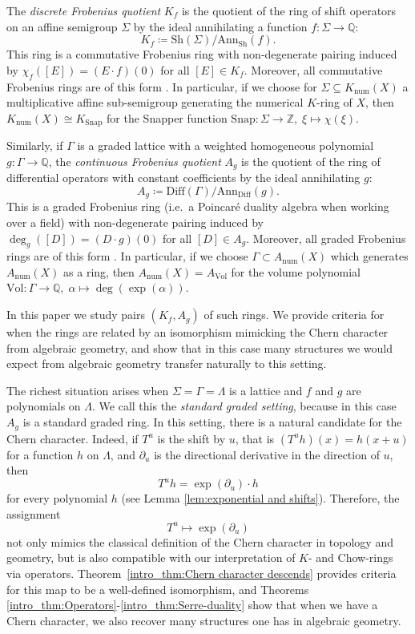 \documentclass[oneside]{amsart}
\theoremstyle{plain}
\theoremstyle{definition}
\newcommand{\Z}{{\mathbb{Z}}}
\newcommand{\Q}{{\mathbb{Q}}}
\newcommand{\Ann}{{\mathrm{Ann}}}
\newcommand{\Diff}{{\mathrm{Diff}}}
\newcommand{\Vol}{{\mathrm{Vol}}}
\newcommand{\Snap}{{\mathrm{Snap}}}
\newcommand{\Sh}{{\mathrm{Sh}}}
\newcommand{\num}{{\mathrm{num}}}
\begin{document}
The \emph{discrete Frobenius quotient} $K_f$ is the quotient of the ring of shift operators on an affine semigroup $\Sigma$ by the ideal annihilating a function $f\colon \Sigma\to \Q$:
\[K_f \coloneqq \Sh(\Sigma)/\Ann_{\Sh}(f).\]
This ring is a commutative Frobenius ring with non-degenerate pairing induced by
$\chi_f([E]) = (E \cdot f)(0)$ for all $[E] \in K_f$. Moreover, all commutative Frobenius rings are of this form \cite{MoninSmirnov23}. In particular, if we choose for $\Sigma\subseteq K_\num(X)$ a multiplicative affine sub-semigroup generating the numerical $K$-ring of $X$, then $K_\num(X) \cong K_\Snap$ for the Snapper function $\Snap: \Sigma \to \Z,\; \xi \mapsto \chi(\xi)$. 

Similarly, if $\Gamma$ is a graded lattice with a weighted homogeneous polynomial $g: \Gamma \to \Q$,
the \emph{continuous Frobenius quotient} $A_g$ is the quotient of the ring of differential operators with constant coefficients by the ideal annihilating $g$:
\[A_g \coloneqq \Diff(\Gamma)/\Ann_{\Diff}(g).\]
This is a graded Frobenius ring (i.e.\ a Poincaré duality algebra when working over a field) with non-degenerate pairing induced by
$\deg_g([D]) = (D \cdot g)(0)$ for all $[D] \in A_g$.
Moreover, all graded Frobenius rings are of this form \cite{Kaveh11, khovanskii2021gorenstein}. In particular, if we choose $\Gamma\subset A_\num(X)$ which generates $A_\num(X)$ as a ring, then $A_\num(X)=A_\Vol$ for the volume polynomial $\Vol\colon \Gamma\to \Q,\;\alpha\mapsto\deg(\exp(\alpha))$.

In this paper we study pairs $(K_f, A_g)$ of such rings. We provide criteria for when the rings are related by an isomorphism mimicking the Chern character from algebraic geometry, and show that in this case many structures we would expect from algebraic geometry transfer naturally to this setting.

The richest situation arises when $\Sigma = \Gamma = \Lambda$ is a lattice and $f$ and $g$ are polynomials on
$\Lambda$. We call this the \emph{standard graded setting}, because in this case $A_g$ is a standard graded ring.
In this setting, there is a natural candidate for the Chern character. Indeed, if $T^u$ is the shift by $u$, that is $(T^u h)(x)=h(x+u)$ for a function $h$ on $\Lambda$, and $\partial_u$ is the directional derivative in the direction of $u$, then 
\[
T^u h =\exp(\partial_u) \cdot h
\]
for every polynomial $h$ (see Lemma \ref{lem:exponential and shifts}). Therefore, the assignment
\[T^u \mapsto \exp(\partial_u)\]
not only mimics the classical definition of the Chern character in topology and geometry, but is also compatible with our interpretation of $K$- and Chow-rings via operators.
Theorem~\ref{intro_thm:Chern character descends} provides criteria for this map to be a well-defined isomorphism, and Theorems \ref{intro_thm:Operators}-\ref{intro_thm:Serre-duality} show that when we have a Chern character, we also recover many structures one has in algebraic geometry.
\end{document}
